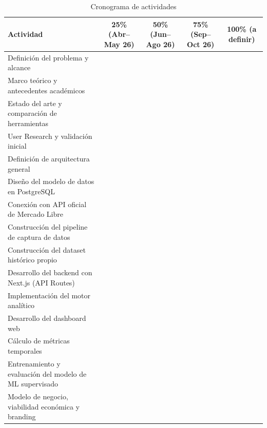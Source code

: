 \begin{table}[ht]
	\centering
	\small
	\renewcommand{\arraystretch}{0.85}
	\caption{Cronograma de actividades}
	\label{tab:gantt}
	\begin{tabularx}{\textwidth}{@{}X c c c c@{}}
		\toprule
		\textbf{Actividad} & \textbf{\footnotesize 25\% (Abr--May 26)} & \textbf{\footnotesize 50\% (Jun--Ago 26)} & \textbf{\footnotesize 75\% (Sep--Oct 26)} & \textbf{\footnotesize 100\% (a definir)} \\
		\midrule
		Definición del problema y alcance                    & \avance &         &         &         \\
		Marco teórico y antecedentes académicos               & \avance & \avance &         &         \\
		Estado del arte y comparación de herramientas          & \avance & \avance &         &         \\
		User Research y validación inicial                    & \avance & \avance &         &         \\
		Definición de arquitectura general                    & \avance & \avance &         &         \\
		Diseño del modelo de datos en PostgreSQL               & \avance & \avance &         &         \\
		Conexión con API oficial de Mercado Libre              & \avance & \avance &         &         \\
		Construcción del pipeline de captura de datos          & \avance & \avance &         &         \\
		Construcción del dataset histórico propio              & \avance & \avance & \avance &         \\
		Desarrollo del backend con Next.js (API Routes)        & \avance & \avance &         &         \\
		Implementación del motor analítico                    &         & \avance &         &         \\
		Desarrollo del dashboard web                          & \avance & \avance &         &         \\
		Cálculo de métricas temporales                        &         & \avance &         &         \\
		Entrenamiento y evaluación del modelo de ML supervisado &         &         & \avance &         \\
		Modelo de negocio, viabilidad económica y branding     &         &         & \avance &         \\

\end{tabularx}
\end{table}
